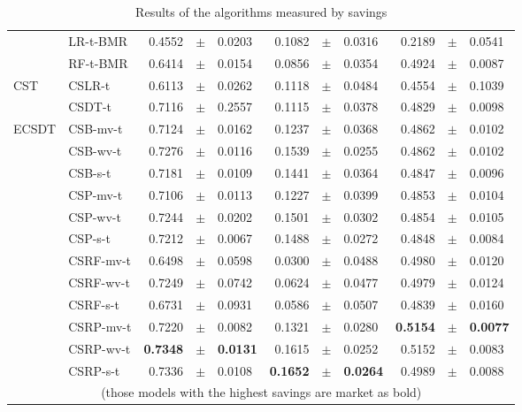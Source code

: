 \begin{table}[!t]
\begin{tabular}{l l r@{\hskip 0in}c@{\hskip 0in}l r@{\hskip 0in}c@{\hskip 0in}l r@{\hskip 
    0in}c@{\hskip 0in}l  }
&LR-t-BMR & 0.4552 &$\pm$& 0.0203 & 0.1082 &$\pm$& 0.0316 & 0.2189 &$\pm$& 0.0541 \\
&RF-t-BMR & 0.6414 &$\pm$& 0.0154 & 0.0856 &$\pm$& 0.0354 & 0.4924 &$\pm$& 0.0087 \\
\hline 
CST&CSLR-t & 0.6113 &$\pm$& 0.0262 & 0.1118 &$\pm$& 0.0484 & 0.4554 &$\pm$& 0.1039 \\
&CSDT-t & 0.7116 &$\pm$& 0.2557 & 0.1115 &$\pm$& 0.0378 & 0.4829 &$\pm$& 0.0098 \\
\hline 
ECSDT&CSB-mv-t & 0.7124 &$\pm$& 0.0162 & 0.1237 &$\pm$& 0.0368 & 0.4862 &$\pm$& 0.0102 \\
&CSB-wv-t & 0.7276 &$\pm$& 0.0116 & 0.1539 &$\pm$& 0.0255 & 0.4862 &$\pm$& 0.0102 \\
&CSB-s-t & 0.7181 &$\pm$& 0.0109 & 0.1441 &$\pm$& 0.0364 & 0.4847 &$\pm$& 0.0096 \\
&CSP-mv-t & 0.7106 &$\pm$& 0.0113 & 0.1227 &$\pm$& 0.0399 & 0.4853 &$\pm$& 0.0104 \\
&CSP-wv-t & 0.7244 &$\pm$& 0.0202 & 0.1501 &$\pm$& 0.0302 & 0.4854 &$\pm$& 0.0105 \\
&CSP-s-t & 0.7212 &$\pm$& 0.0067 & 0.1488 &$\pm$& 0.0272 & 0.4848 &$\pm$& 0.0084 \\
&CSRF-mv-t & 0.6498 &$\pm$& 0.0598 & 0.0300 &$\pm$& 0.0488 & 0.4980 &$\pm$& 0.0120 \\
&CSRF-wv-t & 0.7249 &$\pm$& 0.0742 & 0.0624 &$\pm$& 0.0477 & 0.4979 &$\pm$& 0.0124 \\
&CSRF-s-t & 0.6731 &$\pm$& 0.0931 & 0.0586 &$\pm$& 0.0507 & 0.4839 &$\pm$& 0.0160 \\
&CSRP-mv-t & 0.7220 &$\pm$& 0.0082 & 0.1321 &$\pm$& 0.0280 & \bf{0.5154} &\bf{$\pm$}& \bf{0.0077} \\
&CSRP-wv-t & \bf{0.7348} &\bf{$\pm$}& \bf{0.0131} & 0.1615 &$\pm$& 0.0252 & 0.5152 &$\pm$& 0.0083 \\
&CSRP-s-t & 0.7336 &$\pm$& 0.0108 & \bf{0.1652} &\bf{$\pm$}& \bf{0.0264} & 0.4989 &$\pm$& 0.0088 \\
  \hline
  \multicolumn{11}{c}{(those models with the highest savings are market as bold)}
  \end{tabular}
    \caption{Results of the algorithms measured by savings}
    \label{tab:9:results_savings}
  \end{table}

